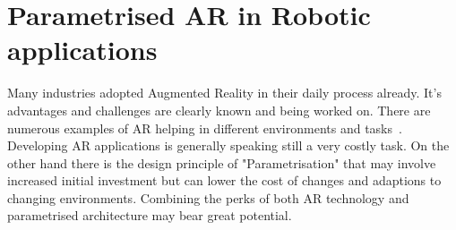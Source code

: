 \section{Parametrised AR in Robotic applications}

Many industries adopted Augmented Reality in their daily process already. It's advantages and challenges are clearly known and being worked on. There are numerous examples of AR helping in different environments and tasks~\cite{DiegmannBenefitsAREdu, SalaminBenefitsAR, ARInMilRepair}. Developing AR applications is generally speaking still a very costly task. On the other hand there is the design principle of "Parametrisation" that may involve increased initial investment but can lower the cost of changes and adaptions to changing environments. Combining the perks of both AR technology and parametrised architecture may bear great potential.












